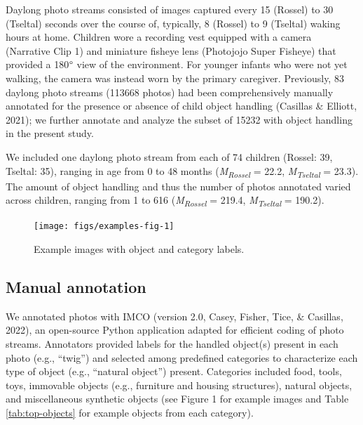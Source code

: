 \documentclass[10pt, letterpaper]{article}
\newenvironment{CodeChunk}{}{}
\begin{document}
Daylong photo streams consisted of images captured every 15 (Rossel) to
30 (Tseltal) seconds over the course of, typically, 8 (Rossel) to 9
(Tseltal) waking hours at home. Children wore a recording vest equipped
with a camera (Narrative Clip 1) and miniature fisheye lens (Photojojo
Super Fisheye) that provided a 180\(\text{\textdegree}\) view of the
environment. For younger infants who were not yet walking, the camera
was instead worn by the primary caregiver. Previously, 83 daylong photo
streams (113668 photos) had been comprehensively manually annotated for
the presence or absence of child object handling (Casillas \& Elliott,
2021); we further annotate and analyze the subset of 15232 with object
handling in the present study.

We included one daylong photo stream from each of 74 children (Rossel:
39, Tseltal: 35), ranging in age from 0 to 48 months
(\emph{M}\textsubscript{\emph{Rossel}} = 22.2,
\emph{M}\textsubscript{\emph{Tseltal}} = 23.3). The amount of object
handling and thus the number of photos annotated varied across children,
ranging from 1 to 616 (\emph{M}\textsubscript{\emph{Rossel}} = 219.4,
\emph{M}\textsubscript{\emph{Tseltal}} = 190.2).

\begin{CodeChunk}
\begin{figure}[h]

{\centering \texttt{[image: figs/examples-fig-1]} 

}

\caption[Example images with object and category labels]{Example images with object and category labels.}\label{fig:examples-fig}
\end{figure}
\end{CodeChunk}

\hypertarget{manual-annotation}{%
\subsection{Manual annotation}\label{manual-annotation}}

We annotated photos with IMCO (version 2.0, Casey, Fisher, Tice, \&
Casillas, 2022), an open-source Python application adapted for efficient
coding of photo streams. Annotators provided labels for the handled
object(s) present in each photo (e.g., ``twig'') and selected among
predefined categories to characterize each type of object (e.g.,
``natural object'') present. Categories included food, tools, toys,
immovable objects (e.g., furniture and housing structures), natural
objects, and miscellaneous synthetic objects (see Figure 1 for example
images and Table \ref{tab:top-objects} for example objects from each
category).
\end{document}
